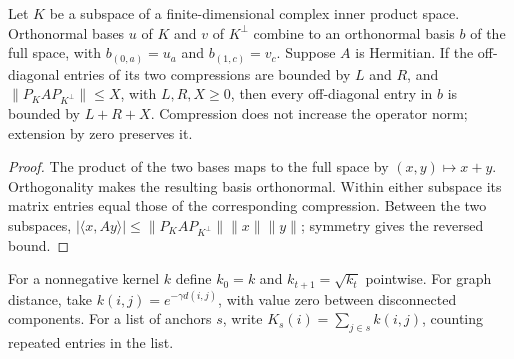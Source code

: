 \begin{lemma}
    \label{thm:hastings05_orthogonal_basis_refinement}
    \leanok
    Let $K$ be a subspace of a finite-dimensional complex inner product space.
    Orthonormal bases $u$ of $K$ and $v$ of $K^\perp$ combine to an orthonormal
    basis $b$ of the full space, with $b_{(0,a)}=u_a$ and $b_{(1,c)}=v_c$.
    Suppose $A$ is Hermitian. If the off-diagonal entries of its two compressions
    are bounded by $L$ and $R$, and $\|P_KAP_{K^\perp}\|\le X$, with
    $L,R,X\ge0$, then every off-diagonal entry in $b$ is bounded by $L+R+X$.
    Compression does not increase the operator norm; extension by zero preserves it.
\end{lemma}
\begin{proof}\leanok
    The product of the two bases maps to the full space by $(x,y)\mapsto x+y$.
    Orthogonality makes the resulting basis orthonormal. Within either subspace
    its matrix entries equal those of the corresponding compression. Between the
    two subspaces, $|\langle x,Ay\rangle|\le\|P_KAP_{K^\perp}\|\|x\|\|y\|$;
    symmetry gives the reversed bound.
\end{proof}

\begin{definition}
    \label{def:hastings05_sqrt_decay_kernel}
    \leanok
    For a nonnegative kernel $k$ define $k_0=k$ and $k_{t+1}=\sqrt{k_t}$
    pointwise. For graph distance, take $k(i,j)=e^{-\gamma d(i,j)}$, with value
    zero between disconnected components. For a list of anchors $s$, write
    $K_s(i)=\sum_{j\in s}k(i,j)$, counting repeated entries in the list.
\end{definition}

